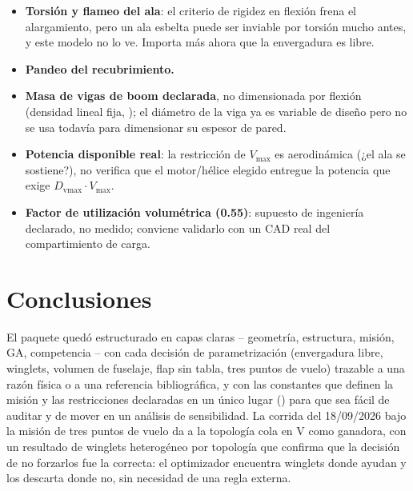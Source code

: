 \documentclass[11pt,a4paper]{article}
\newcommand{\code}[1]{\texttt{\detokenize{#1}}}
\begin{document}
\begin{itemize}[nosep]
  \item \textbf{Torsión y flameo del ala}: el criterio de rigidez en flexión frena el alargamiento, pero un ala esbelta puede ser inviable por torsión mucho antes, y este modelo no lo ve. Importa más ahora que la envergadura es libre.
  \item \textbf{Pandeo del recubrimiento.}
  \item \textbf{Masa de vigas de boom declarada}, no dimensionada por flexión (densidad lineal fija, \code{MASA_LINEAL_BOOM}); el diámetro de la viga ya es variable de diseño pero no se usa todavía para dimensionar su espesor de pared.
  \item \textbf{Potencia disponible real}: la restricción de $V_\text{max}$ es aerodinámica (¿el ala se sostiene?), no verifica que el motor/hélice elegido entregue la potencia que exige $D_\text{vmax}\cdot V_\text{max}$.
  \item \textbf{Factor de utilización volumétrica (0.55)}: supuesto de ingeniería declarado, no medido; conviene validarlo con un CAD real del compartimiento de carga.
\end{itemize}

\section{Conclusiones}

El paquete quedó estructurado en capas claras -- geometría, estructura, misión, GA, competencia -- con cada decisión de parametrización (envergadura libre, winglets, volumen de fuselaje, flap sin tabla, tres puntos de vuelo) trazable a una razón física o a una referencia bibliográfica, y con las constantes que definen la misión y las restricciones declaradas en un único lugar (\code{mision_avion.py}) para que sea fácil de auditar y de mover en un análisis de sensibilidad. La corrida del 18/09/2026 bajo la misión de tres puntos de vuelo da a la topología cola en V como ganadora, con un resultado de winglets heterogéneo por topología que confirma que la decisión de no forzarlos fue la correcta: el optimizador encuentra winglets donde ayudan y los descarta donde no, sin necesidad de una regla externa.
\end{document}
